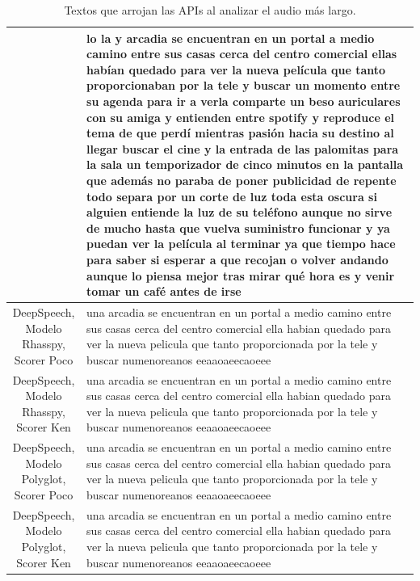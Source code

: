 \begin{table}
	\begin{tabularx}{\textwidth}{|c|X|}
		\hline
		\makecell{Vosk} & lo la y arcadia se encuentran en un portal a medio camino entre sus casas cerca del centro comercial ellas habían quedado para ver la nueva película que tanto proporcionaban por la tele y buscar un momento entre su agenda para ir a verla comparte un beso auriculares con su amiga y entienden entre spotify y reproduce el tema de que perdí mientras pasión hacia su destino al llegar buscar el cine y la entrada de las palomitas para la sala un temporizador de cinco minutos en la pantalla que además no paraba de poner publicidad de repente todo separa por un corte de luz toda esta oscura si alguien entiende la luz de su teléfono aunque no sirve de mucho hasta que vuelva suministro funcionar y ya puedan ver la película al terminar ya que tiempo hace para saber si esperar a que recojan o volver andando aunque lo piensa mejor tras mirar qué hora es y venir tomar un café antes de irse \\ \hline
		\makecell{DeepSpeech,\\ Modelo Rhasspy,\\ Scorer Poco} & una arcadia se encuentran en un portal a medio camino entre sus casas cerca del centro comercial ella habian quedado para ver la nueva pelicula que tanto proporcionada por la tele y buscar numenoreanos eeaaoaeecaoeee \\ \hline
		\makecell{DeepSpeech,\\ Modelo Rhasspy,\\ Scorer Ken} & una arcadia se encuentran en un portal a medio camino entre sus casas cerca del centro comercial ella habian quedado para ver la nueva pelicula que tanto proporcionada por la tele y buscar numenoreanos eeaaoaeecaoeee \\ \hline
		\makecell{DeepSpeech,\\ Modelo Polyglot,\\ Scorer Poco} & una arcadia se encuentran en un portal a medio camino entre sus casas cerca del centro comercial ella habian quedado para ver la nueva pelicula que tanto proporcionada por la tele y buscar numenoreanos eeaaoaeecaoeee \\ \hline
		\makecell{DeepSpeech,\\ Modelo Polyglot,\\ Scorer Ken} & una arcadia se encuentran en un portal a medio camino entre sus casas cerca del centro comercial ella habian quedado para ver la nueva pelicula que tanto proporcionada por la tele y buscar numenoreanos eeaaoaeecaoeee\\ \hline
		
	\end{tabularx}
	\caption{Textos que arrojan las APIs al analizar el audio más largo.}
	\label{tab:predicts}
\end{table}

